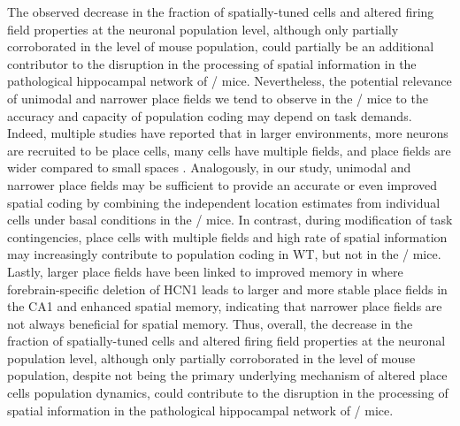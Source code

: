 The observed decrease in the fraction of spatially-tuned cells and altered firing field properties at the neuronal population level, although only partially corroborated in the level of mouse population, could partially be an additional contributor to the disruption in the processing of spatial information in the pathological hippocampal network of \df/ mice. Nevertheless, the potential relevance of unimodal and narrower place fields we tend to observe in the \df/ mice to the accuracy and capacity of population coding may depend on task demands. Indeed, multiple studies have reported that in larger environments, more neurons are recruited to be place cells, many cells have multiple fields, and place fields are wider compared to small spaces \citep{Fenton2008, Park2011, Kjelstrup2008, Rich2014}. Analogously, in our study, unimodal and narrower place fields may be sufficient to provide an accurate or even improved spatial coding by combining the independent location estimates from individual cells under basal conditions in the \df/ mice.  In contrast, during modification of task contingencies, place cells with multiple fields and high rate of spatial information may increasingly contribute to population coding in WT, but not in the \df/ mice. Lastly, larger place fields have been linked to improved memory in \citet{Hussaini2011} where forebrain-specific deletion of HCN1 leads to larger and more stable place fields in the CA1 and enhanced spatial memory, indicating that narrower place fields are not always beneficial for spatial memory. Thus, overall, the decrease in the fraction of spatially-tuned cells and altered firing field properties at the neuronal population level, although only partially corroborated in the level of mouse population, despite not being the primary underlying mechanism of altered place cells population dynamics, could contribute to the disruption in the processing of spatial information in the pathological hippocampal network of \df/ mice.

